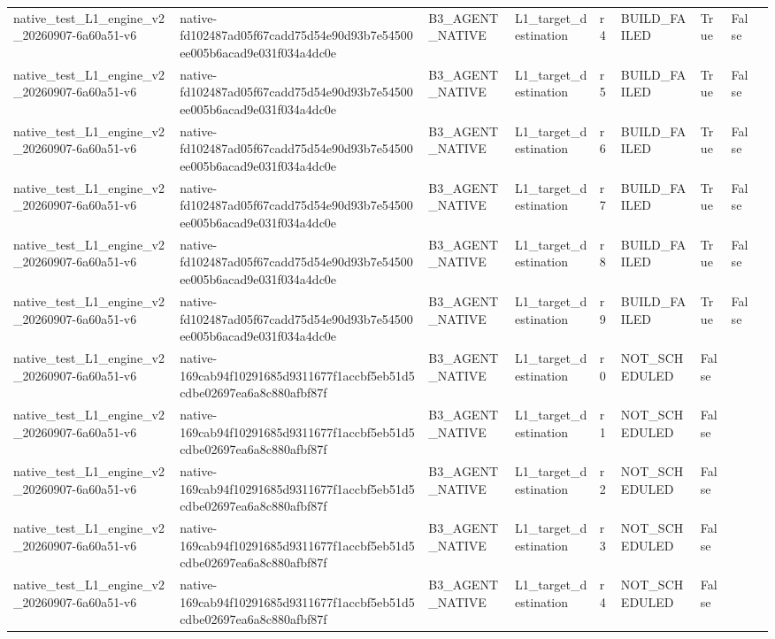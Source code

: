 \begin{tabular}{lllllllll}
native\_test\_L1\_engine\_v2\_20260907-6a60a51-v6 & native-fd102487ad05f67cadd75d54e90d93b7e54500ee005b6acad9e031f034a4dc0e & B3\_AGENT\_NATIVE & L1\_target\_destination & r4 & BUILD\_FAILED & True & False &  \\
native\_test\_L1\_engine\_v2\_20260907-6a60a51-v6 & native-fd102487ad05f67cadd75d54e90d93b7e54500ee005b6acad9e031f034a4dc0e & B3\_AGENT\_NATIVE & L1\_target\_destination & r5 & BUILD\_FAILED & True & False &  \\
native\_test\_L1\_engine\_v2\_20260907-6a60a51-v6 & native-fd102487ad05f67cadd75d54e90d93b7e54500ee005b6acad9e031f034a4dc0e & B3\_AGENT\_NATIVE & L1\_target\_destination & r6 & BUILD\_FAILED & True & False &  \\
native\_test\_L1\_engine\_v2\_20260907-6a60a51-v6 & native-fd102487ad05f67cadd75d54e90d93b7e54500ee005b6acad9e031f034a4dc0e & B3\_AGENT\_NATIVE & L1\_target\_destination & r7 & BUILD\_FAILED & True & False &  \\
native\_test\_L1\_engine\_v2\_20260907-6a60a51-v6 & native-fd102487ad05f67cadd75d54e90d93b7e54500ee005b6acad9e031f034a4dc0e & B3\_AGENT\_NATIVE & L1\_target\_destination & r8 & BUILD\_FAILED & True & False &  \\
native\_test\_L1\_engine\_v2\_20260907-6a60a51-v6 & native-fd102487ad05f67cadd75d54e90d93b7e54500ee005b6acad9e031f034a4dc0e & B3\_AGENT\_NATIVE & L1\_target\_destination & r9 & BUILD\_FAILED & True & False &  \\
native\_test\_L1\_engine\_v2\_20260907-6a60a51-v6 & native-169cab94f10291685d9311677f1accbf5eb51d5cdbe02697ea6a8c880afbf87f & B3\_AGENT\_NATIVE & L1\_target\_destination & r0 & NOT\_SCHEDULED & False &  &  \\
native\_test\_L1\_engine\_v2\_20260907-6a60a51-v6 & native-169cab94f10291685d9311677f1accbf5eb51d5cdbe02697ea6a8c880afbf87f & B3\_AGENT\_NATIVE & L1\_target\_destination & r1 & NOT\_SCHEDULED & False &  &  \\
native\_test\_L1\_engine\_v2\_20260907-6a60a51-v6 & native-169cab94f10291685d9311677f1accbf5eb51d5cdbe02697ea6a8c880afbf87f & B3\_AGENT\_NATIVE & L1\_target\_destination & r2 & NOT\_SCHEDULED & False &  &  \\
native\_test\_L1\_engine\_v2\_20260907-6a60a51-v6 & native-169cab94f10291685d9311677f1accbf5eb51d5cdbe02697ea6a8c880afbf87f & B3\_AGENT\_NATIVE & L1\_target\_destination & r3 & NOT\_SCHEDULED & False &  &  \\
native\_test\_L1\_engine\_v2\_20260907-6a60a51-v6 & native-169cab94f10291685d9311677f1accbf5eb51d5cdbe02697ea6a8c880afbf87f & B3\_AGENT\_NATIVE & L1\_target\_destination & r4 & NOT\_SCHEDULED & False &  &  \\

\end{tabular}
